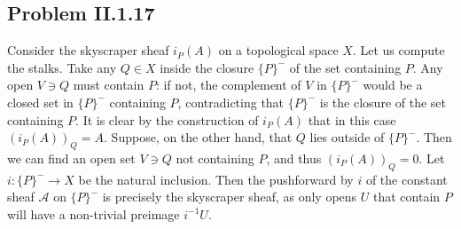 \documentclass{mathnotes}
\begin{document}
\subsection*{Problem II.1.17}
Consider the skyscraper sheaf $i_P(A)$ on a topological space $X$. Let us compute the stalks. Take any $Q\in X$ inside the
closure $\{P\}^-$ of the set containing $P$. Any open $V\ni Q$ must contain $P$: if not, the complement of $V$ in $\{P\}^-$ would
be a closed set in $\{P\}^-$ containing $P$, contradicting that $\{P\}^-$ is the closure of the set containing $P$. It is
clear by the construction of $i_P(A)$ that in this case $(i_P(A))_Q=A$. Suppose, on the other hand, that $Q$ lies outside
of $\{P\}^-$. Then we can find an open set $V\ni Q$ not containing $P$, and thus $(i_P(A))_Q=0$.
Let $i:\{P\}^-\to X$ be the natural inclusion. Then the pushforward by $i$ of the constant sheaf $\mathcal{A}$ on $\{P\}^-$
is precisely the skyscraper sheaf, as only opens $U$ that contain $P$ will have a non-trivial preimage $i^{-1}U$.
\end{document}
